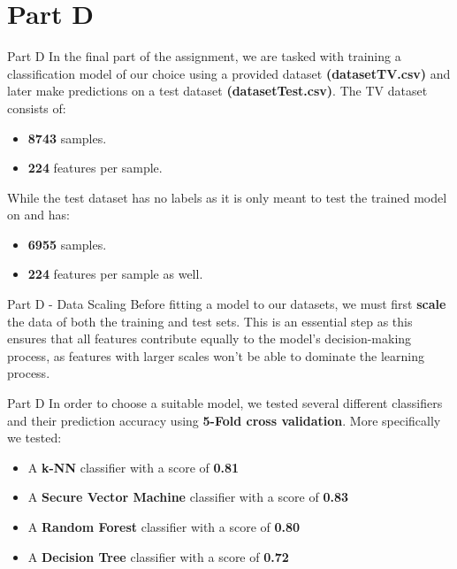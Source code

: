 \documentclass{beamer}
\begin{document}
\section{Part D}
    \begin{frame}{Part D}
    In the final part of the assignment, we are tasked with training a classification model of our choice using a provided
    dataset  \textbf{(datasetTV.csv)} and later make predictions on a test dataset \textbf{(datasetTest.csv)}. The TV dataset
    consists of:
    \begin{itemize}
        \item \textbf{8743} samples.
        \item \textbf{224} features per sample.
    \end{itemize}
    While the test dataset has no labels as it is only meant to test the trained model on and has:
    \begin{itemize}
        \item \textbf{6955} samples.
        \item \textbf{224} features per sample as well.
    \end{itemize}
    \end{frame}

    \begin{frame}{Part D - Data Scaling}
    Before fitting a model to our datasets, we must first \textbf{scale} the data of both the training and test sets.
    This is an essential step as this ensures that all features contribute equally to the model's decision-making process,
    as features with larger scales won't be able to dominate the learning process.
    \end{frame}

    \begin{frame}{Part D}
    In order to choose a suitable model, we tested several different classifiers and their prediction accuracy 
    using \textbf{5-Fold cross validation}. More specifically we tested:
    \begin{itemize}
        \item A \textbf{k-NN} classifier with a score of \textbf{0.81}
        \item A \textbf{Secure Vector Machine} classifier with a score of \textbf{0.83}
        \item A \textbf{Random Forest} classifier with a score of \textbf{0.80}
        \item A \textbf{Decision Tree} classifier with a score of \textbf{0.72}
    \end{itemize}
    \end{frame}
\end{document}
